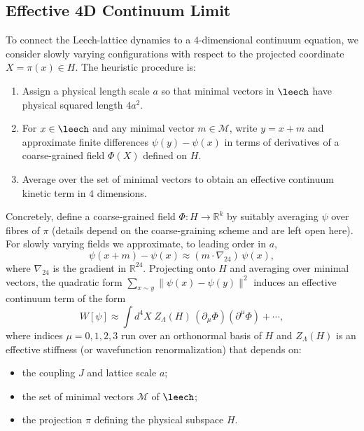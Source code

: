 \subsection{Effective 4D Continuum Limit}
\label{subsec:kappa-leech-continuum}

To connect the Leech-lattice dynamics to a $4$-dimensional continuum equation,
we consider slowly varying configurations with respect to the projected
coordinate $X = \pi(x) \in H$. The heuristic procedure is:
\begin{enumerate}
  \item Assign a physical length scale $a$ so that minimal vectors in
        $\leech$ have physical squared length $4a^2$.
  \item For $x \in \leech$ and any minimal vector $m \in \mathcal{M}$, write
        $y = x + m$ and approximate finite differences
        $\psi(y) - \psi(x)$ in terms of derivatives of a coarse-grained field
        $\Phi(X)$ defined on $H$.
  \item Average over the set of minimal vectors to obtain an effective
        continuum kinetic term in $4$ dimensions.
\end{enumerate}

Concretely, define a coarse-grained field $\Phi : H \to \mathbb{R}^k$ by
suitably averaging $\psi$ over fibres of $\pi$ (details depend on the
coarse-graining scheme and are left open here). For slowly varying fields we
approximate, to leading order in $a$,
\begin{equation}
  \psi(x + m) - \psi(x) \approx (m \cdot \nabla_{24})\,\psi(x),
\end{equation}
where $\nabla_{24}$ is the gradient in $\mathbb{R}^{24}$. Projecting onto $H$
and averaging over minimal vectors, the quadratic form
$\sum_{x\sim y} \|\psi(x) - \psi(y)\|^2$ induces an effective continuum term
of the form
\begin{equation}
  W[\psi] \approx \int d^4X\; Z_{\Lambda}(H)
  \, (\partial_\mu \Phi)(\partial^\mu \Phi) + \cdots,
\end{equation}
where indices $\mu = 0,1,2,3$ run over an orthonormal basis of $H$ and
$Z_{\Lambda}(H)$ is an effective stiffness (or wavefunction renormalization)
that depends on:
\begin{itemize}
  \item the coupling $J$ and lattice scale $a$;
  \item the set of minimal vectors $\mathcal{M}$ of $\leech$;
  \item the projection $\pi$ defining the physical subspace $H$.
\end{itemize}

